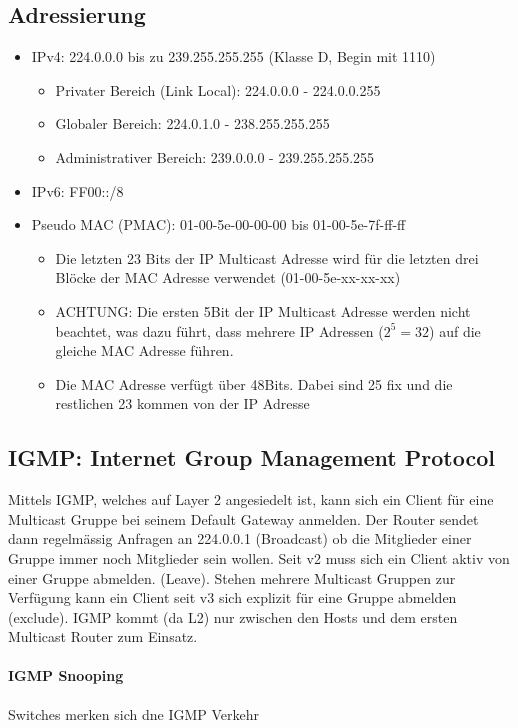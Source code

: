 \subsection{Adressierung}
\begin{itemize}
	\item IPv4: 224.0.0.0 bis zu 239.255.255.255 (Klasse D, Begin mit 1110)
	\begin{itemize}
		\item Privater Bereich (Link Local): 224.0.0.0 - 224.0.0.255
		\item Globaler Bereich: 224.0.1.0 - 238.255.255.255
		\item Administrativer Bereich: 239.0.0.0 - 239.255.255.255
	\end{itemize}
	\item IPv6: FF00::/8
	\item Pseudo MAC (PMAC): 01-00-5e-00-00-00 bis 01-00-5e-7f-ff-ff
	\begin{itemize}
		\item Die letzten 23 Bits der IP Multicast Adresse wird für die letzten drei Blöcke der MAC Adresse verwendet (01-00-5e-xx-xx-xx)
		\item ACHTUNG: 	Die ersten 5Bit der IP Multicast Adresse werden nicht beachtet, was dazu führt, dass mehrere IP Adressen ($2^5 = 32$) auf die gleiche MAC Adresse führen.
		\item Die MAC Adresse verfügt über 48Bits. Dabei sind 25 fix und die restlichen 23 kommen von der IP Adresse	
	\end{itemize}
\end{itemize}

\subsection{IGMP: Internet Group Management Protocol}
Mittels IGMP, welches auf Layer 2 angesiedelt ist, kann sich ein Client für eine Multicast Gruppe bei seinem Default Gateway anmelden. Der Router sendet dann regelmässig Anfragen an 224.0.0.1 (Broadcast) ob die Mitglieder einer Gruppe immer noch Mitglieder sein wollen. Seit v2 muss sich ein Client aktiv von einer Gruppe abmelden. (Leave). Stehen mehrere Multicast Gruppen zur Verfügung kann ein Client seit v3 sich explizit für eine Gruppe abmelden (exclude). IGMP kommt (da L2) nur zwischen den Hosts und dem ersten Multicast Router zum Einsatz. 

\paragraph{IGMP Snooping}
Switches merken sich dne IGMP Verkehr

